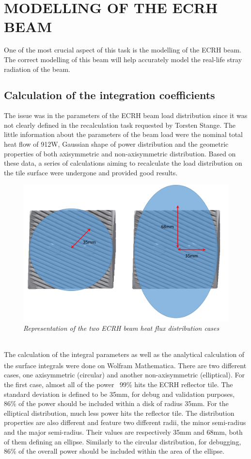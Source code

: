 \section{MODELLING OF THE ECRH BEAM} \label{MODELLING OF THE ECRH BEAM}
\normalsize{One of the most crucial aspect of this task is the modelling of the \acrshort{ECRH} beam. The correct modelling of this beam will help accurately model the real-life stray radiation of the beam.}
\subsection{Calculation of the integration coefficients}
\normalsize{The issue was in the parameters of the \acrshort{ECRH} beam load distribution since it was not clearly defined in the recalculation task requested by Torsten Stange. The little information about the parameters of the beam load were the nominal total heat flow of 912W, Gaussian shape of power distribution and the geometric properties of both axisymmetric and non-axisymmetric distribution. Based on these data, a series of calculations aiming to recalculate the load distribution on the tile surface  were undergone and provided good results.}
\\
\begin{figure}[h!]
    \label{fig_4_1} 
    \centering
    \includegraphics[width=.9\textwidth]{figures/TWOBEAMDISTRI.png}
    \caption{\it Representation of the two ECRH beam heat flux distribution cases}
\end{figure}
\\
\normalsize{\indent The calculation of the integral parameters as well as the analytical calculation of the surface integrals were done on Wolfram Mathematica\textsuperscript{\textregistered}. There are two different cases, one axisymmetric (circular) and another non-axisymmetric (elliptical). For the first case, almost all of the power ~99\% hits the ECRH reflector tile. The standard deviation is defined to be 35mm, for debug and validation purposes, 86\% of the power should be included within a disk of radius 35mm. For the elliptical distribution, much less power hits the reflector tile. The distribution properties are also different and feature two different radii, the minor semi-radius and the major semi-radius. Their values are respectively 35mm and 68mm, both of them defining an ellipse. Similarly to the circular distribution, for debugging, 86\% of the overall power should be included within the area of the ellipse.}
